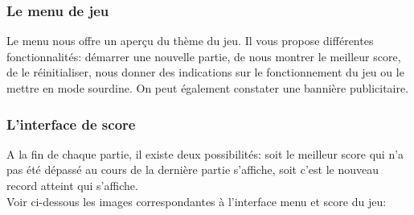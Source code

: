 \documentclass{article}
\begin{document}
\subsubsection{Le menu de jeu}
Le menu nous offre un aperçu du thème du jeu. Il vous propose différentes fonctionnalités: démarrer une nouvelle partie, de nous montrer le meilleur score, de le réinitialiser, nous donner des indications sur le fonctionnement du jeu ou le mettre en mode sourdine. On peut également constater une bannière publicitaire.

\subsubsection{L'interface de score}
A la fin de chaque partie, il existe deux possibilités: soit le meilleur score qui n'a pas été dépassé au cours de la dernière partie s'affiche, soit c'est le nouveau record atteint qui s'affiche.\\

Voir ci-dessous les images correspondantes à l'interface menu et score du jeu:
\end{document}
